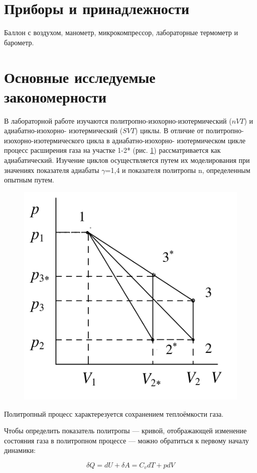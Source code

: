 \documentclass[12pt,a4paper]{article}%
\begin{document}
\section*{Приборы и принадлежности}

Баллон с воздухом, манометр, 
микрокомпрессор, лабораторные термометр и барометр.

\section*{Основные исследуемые закономерности}

В лабораторной работе изучаются
политропно-изохорно-изотермический ($nVT$) и адиабатно-изохорно-
изотермический ($SVT$) циклы. В отличие от политропно-изохорно-изотермического цикла в адиабатно-изохорно-
изотермическом цикле процесс расширения газа на участке 1-2* (рис. \ref{pp1}) рассматривается как адиабатический. Изучение циклов
осуществляется путем их моделирования при значениях показателя адиабаты
$ \gamma $=1,4 и показателя политропы n, определенным опытным путем.

\begin{figure}[htp!]
	\centering
	\includegraphics[width=0.7\linewidth]{p1}
	\caption{}
	\label{pp1}
\end{figure}

\newpage

Политропный процесс характерезуется сохранением теплоёмкости газа.

Чтобы определить показатель политропы --- кривой, отображающей изменение состояния газа в политропном процессе --- можно обратиться к первому началу динамики:

\begin{equation}
	\delta Q = dU + \delta A = C_vdT + p dV
\end{equation}
\end{document}
